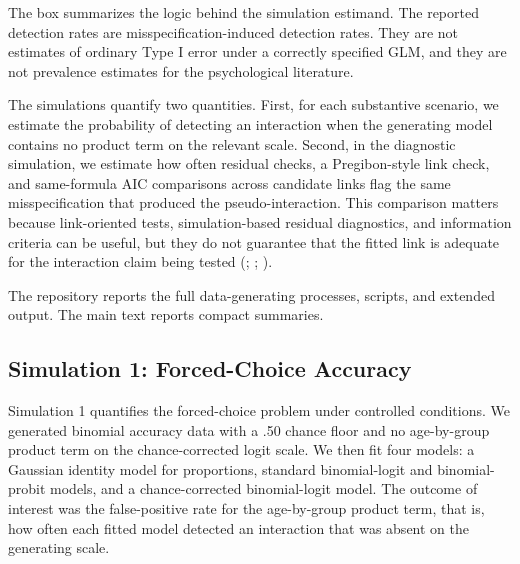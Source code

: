 \documentclass[
  man,
  longtable,
  nolmodern,
  notxfonts,
  notimes,
  colorlinks=true,linkcolor=blue,citecolor=blue,urlcolor=blue]{apa7}
\begin{document}
The box summarizes the logic behind the simulation estimand. The
reported detection rates are misspecification-induced detection rates.
They are not estimates of ordinary Type I error under a correctly
specified GLM, and they are not prevalence estimates for the
psychological literature.

The simulations quantify two quantities. First, for each substantive
scenario, we estimate the probability of detecting an interaction when
the generating model contains no product term on the relevant scale.
Second, in the diagnostic simulation, we estimate how often residual
checks, a Pregibon-style link check, and same-formula AIC comparisons
across candidate links flag the same misspecification that produced the
pseudo-interaction. This comparison matters because link-oriented tests,
simulation-based residual diagnostics, and information criteria can be
useful, but they do not guarantee that the fitted link is adequate for
the interaction claim being tested (; ;
).

The repository reports the full data-generating processes, scripts, and
extended output. The main text reports compact summaries.

\subsection{Simulation 1: Forced-Choice
Accuracy}\label{simulation-1-forced-choice-accuracy}

Simulation 1 quantifies the forced-choice problem under controlled
conditions. We generated binomial accuracy data with a .50 chance floor
and no age-by-group product term on the chance-corrected logit scale. We
then fit four models: a Gaussian identity model for proportions,
standard binomial-logit and binomial-probit models, and a
chance-corrected binomial-logit model. The outcome of interest was the
false-positive rate for the age-by-group product term, that is, how
often each fitted model detected an interaction that was absent on the
generating scale.
\end{document}
